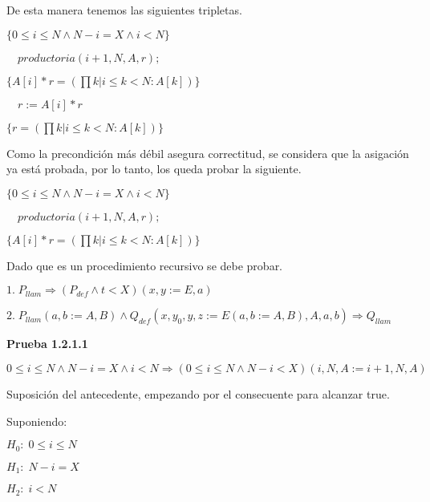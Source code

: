 \documentclass[hidelinks]{article}
\begin{document}
\begin{itemize}
	      De esta manera tenemos las siguientes tripletas.\par
	      $\{0 \leq i \leq N \land N - i = X \land i < N\}$\par
	      $\quad productoria(i + 1, N, A, r);$\par
	      $\{A[i]*r = (\prod k | i \leq k < N: A[k])\}$\par
	      $\quad r := A[i] * r$\par
	      $\{r = (\prod k | i \leq k < N: A[k])\} $\par

	      Como la precondición más débil asegura correctitud, se considera que la
	      asigación ya está probada, por lo tanto, los queda probar la siguiente.\par

	      $\{0 \leq i \leq N \land N - i = X \land i < N\}$\par
	      $\quad productoria(i + 1, N, A, r);$\par
	      $\{A[i]*r = (\prod k | i \leq k < N: A[k])\}$\par

	      Dado que es un procedimiento recursivo se debe probar.\par
	      $1. \; P_{llam} \Rightarrow (P_{def} \land t < X)(x,y := E,a)$\par
	      $2. \; P_{llam}(a,b := A,B) \land Q_{def}(x,y_0,y,z := E(a,b := A,B), A, a,b) \Rightarrow Q_{llam}$\par

	      \textbf{Prueba 1.2.1.1}\par
	      $0 \leq i \leq N \land N - i = X \land i < N \Rightarrow (0 \leq i \leq N \land N - i < X)(i,N, A := i + 1,N,A)$\par

	      Suposición del antecedente, empezando por el consecuente para alcanzar true.\par

	      Suponiendo:\par
	      $H_0: \; 0 \leq i \leq N$\par
	      $H_1: \; N - i = X$\par
	      $H_2: \; i < N$\par


\end{itemize}
\end{document}
